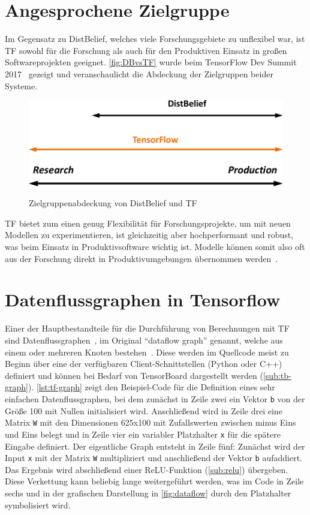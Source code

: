 \section{Angesprochene Zielgruppe}
Im Gegensatz zu DistBelief, welches viele Forschungsgebiete zu unflexibel war, ist \gls{TF} sowohl für die Forschung als auch für den Produktiven Einsatz in großen Softwareprojekten geeignet. \autoref{fig:DBvsTF} wurde beim TensorFlow Dev Summit 2017~\cite{tf-sum17-keynote} gezeigt und veranschaulicht die Abdeckung der Zielgruppen beider Systeme.

\begin{figure}[htb!]
	\centering
	 \includegraphics[width=.7\textwidth]{images/DistBeliefvsTensorFlow.pdf}\\
	\vspace{10pt} 
	\caption{Zielgruppenabdeckung von DistBelief und \gls{TF}~\cite{tf-sum17-keynote}}
	\label{fig:DBvsTF}
\end{figure}

\gls{TF} bietet zum einen genug Flexibilität für Forschungsprojekte, um mit neuen Modellen zu experimentieren, ist gleichzeitig aber hochperformant und robust, was beim Einsatz in Produktivsoftware wichtig ist. Modelle können somit also oft aus der Forschung direkt in Produktivumgebungen übernommen werden~\cite{tensorflow2016-whitepaper}.

\section{Datenflussgraphen in Tensorflow}
Einer der Hauptbestandteile für die Durchführung von Berechnungen mit \gls{TF} sind Datenflussgraphen~\cite{dataflow}, im Original "`dataflow graph"' genannt, welche aus einem oder mehreren Knoten bestehen~\cite{tensorflow2015-whitepaper}. Diese werden im Quellcode meist zu Beginn über eine der verfügbaren Client-Schnittstellen (Python oder C++) definiert und können bei Bedarf von TensorBoard dargestellt werden (\autoref{sub:tb-graph}). \autoref{lst:tf-graph} zeigt den Beispiel-Code für die Definition eines sehr einfachen Datenflussgraphen, bei dem zunächst in Zeile zwei ein Vektor \lstinline$b$ von der Größe 100 mit Nullen initialisiert wird. Anschließend wird in Zeile drei eine Matrix \lstinline$W$ mit den Dimensionen 625x100 mit Zufallswerten zwischen minus Eins und Eins belegt und in Zeile vier ein variabler Platzhalter \lstinline$x$ für die spätere Eingabe definiert. Der eigentliche Graph entsteht in Zeile fünf: Zunächst wird der Input \lstinline$x$ mit der Matrix \lstinline$W$ multipliziert und anschließend der Vektor \lstinline$b$ aufaddiert. Das Ergebnis wird abschließend einer ReLU-Funktion (\autoref{sub:relu}) übergeben. Diese Verkettung kann beliebig lange weitergeführt werden, was im Code in Zeile sechs und in der grafischen Darstellung in \autoref{fig:dataflow} durch den Platzhalter symbolisiert wird.

